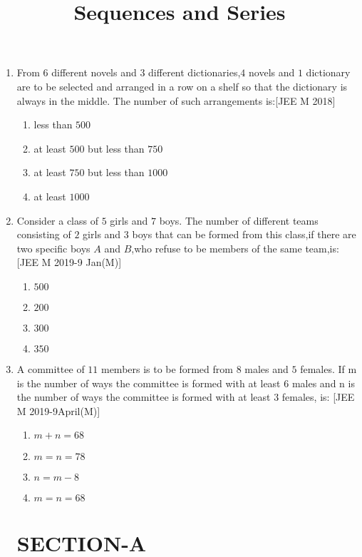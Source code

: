\documentclass[journal,12pt,onecolumn]{IEEEtran}
\theoremstyle{remark}
\begin{document}
\begin{enumerate}
	\item From $6$ different novels and $3$ different dictionaries,$4$ novels and $1$ dictionary are to be selected and arranged in a row on a shelf so that  the dictionary is always in the middle. The number of such arrangements is:\hfill{[JEE M 2018]}
 \begin{enumerate}
     \item less than $500$ 
     \item at least $500$ but less than $750$
     \item at least $750$ but less than $1000$
     \item at least $1000$
     \end{enumerate}

	\item Consider a class of $5$ girls and $7$ boys. The number of different teams consisting of $2$ girls and $3$ boys that can be formed from this class,if there are two specific boys $A$ and $B$,who refuse to be members of the same team,is:\hfill{[JEE M 2019-9 Jan(M)]}
\begin{enumerate}
    \item $500$  
    \item $200$
    \item $300$
    \item $350$
    \end{enumerate}

	\item A committee of $11$ members is to be formed from $8$ males and $5$ females. If m is the number of ways the committee is formed with at least $6$ males and n is the number of ways the committee is formed with at least $3$ females, is:
		\hfill{[JEE M 2019-9April(M)]}
\begin{enumerate}
      \item $m+n=68$ 
      \item $m=n=78$
      \item $n=m-8$
      \item $m=n=68$
  \end{enumerate}  

\newpage 
\title{ Sequences and Series}
\maketitle
\section{SECTION-A}


\end{enumerate}
\end{document}
